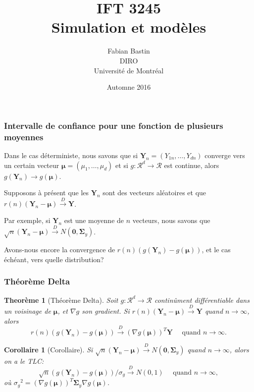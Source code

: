 \documentclass[t,usepdftitle=false]{beamer}
\title[IFT3245]{IFT 3245\\Simulation et modèles}
\author[Fabian Bastin]{Fabian Bastin\\DIRO\\Université de Montréal}
\date{Automne 2016}
\def\bY{\boldsymbol{Y}}
\def\bmu{\boldsymbol{\mu}}
\def\bSigma{\boldsymbol{\Sigma}}
\def\bzero{\boldsymbol{0}}
\def\RR{\mathcal{R}}
\def\To{\overset{D}{\to}}
\newtheorem{thm}{Theorème}
\newtheorem{coro}{Corollaire}
\begin{document}
\frame{\titlepage}

\begin{frame}
\frametitle{Intervalle de confiance pour une fonction de plusieurs
  moyennes}
\label{sec:foncmoy}

Dans le cas déterministe, nous savons que si ${\bY_n} =
(Y_{1n},\dots,Y_{dn})$ converge vers un certain vecteur $\bmu =
(\mu_1,\dots,\mu_d)$ et si ${g} : \RR^d\to \RR$ est continue, alors
$g(\bY_n)\to g(\bmu)$.

\mbox{}

Supposons à présent que les $\bY_n$ sont des vecteurs
  aléatoires et que ${r(n)} (\bY_n-\bmu) \To \bY$.

\mbox{}

Par exemple, si $\bY_n$ est une moyenne de $n$ vecteurs, nous
savons que  $\sqrt{n}(\bY_n-\bmu) \To N(\bzero,\bSigma_y)$.

\mbox{}

Avons-nous encore la convergence de
$r(n)(g(\bY_n) - g(\bmu))$, et le cas échéant, vers quelle distribution?

\end{frame}

\begin{frame}
\frametitle{Théorème Delta}

\begin{thm}[Théorème Delta]
Soit ${g} :\RR^d\to\RR$ continûment différentiable 
dans un voisinage de $\bmu$, et $\nabla g$ son gradient.
Si ${r(n)}(\bY_n-\bmu) \To \bY$ quand $n\to\infty$, alors
\[
  r(n) (g(\bY_n)-g(\bmu)) \To (\nabla g(\bmu))^T \bY 
                                \quad\mbox{ quand } n\to\infty.
\]
\end{thm}

\mbox{}

\begin{coro}[Corollaire]
Si $\sqrt{n}(\bY_n - \bmu) \To N(\bzero,\bSigma_y)$ quand $n\to\infty$,
alors on a le TLC:
\[
  \sqrt{n}(g(\bY_n) - g(\bmu))/\sigma_g \To N(0,1)
  \quad\mbox{ quand } n\to\infty,
\] 
où ${\sigma_g}^2 = (\nabla g(\bmu))^T\bSigma_y\nabla g(\bmu)$.
\end{coro}

\end{frame}
\end{document}
